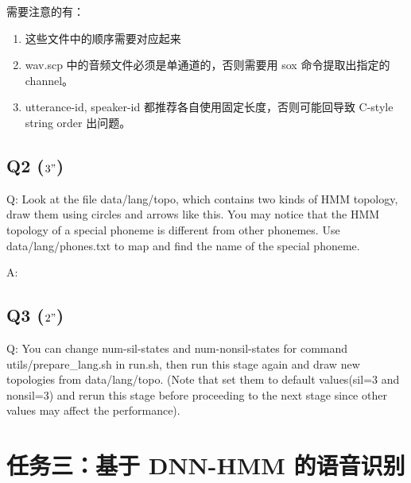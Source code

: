 \documentclass[degree=project, degree-type=project]{thuthesis}
\begin{document}
需要注意的有：

\begin{enumerate}
  \item 这些文件中的顺序需要对应起来
  \item wav.scp 中的音频文件必须是单通道的，否则需要用 sox 命令提取出指定的 channel。
  \item utterance-id, speaker-id 都推荐各自使用固定长度，否则可能回导致 C-style string order 出问题。
\end{enumerate}

\section{Q2 ($3"$)}

Q: Look at the file data/lang/topo, which contains two kinds of HMM topology, draw them using circles and arrows like this. You may notice that the HMM topology of a special phoneme is different from other phonemes. Use data/lang/phones.txt to map and find the name of the special phoneme.

A: 

\section{Q3 ($2"$)}

Q: You can change num-sil-states and num-nonsil-states for command utils/prepare\_lang.sh in run.sh, then run this stage again and draw new topologies from data/lang/topo. (Note that set them to default values(sil=3 and nonsil=3) and rerun this stage before proceeding to the next stage since other values may affect the performance).

\chapter{任务三：基于 DNN-HMM 的语音识别}

\backmatter


\appendix
\end{document}
